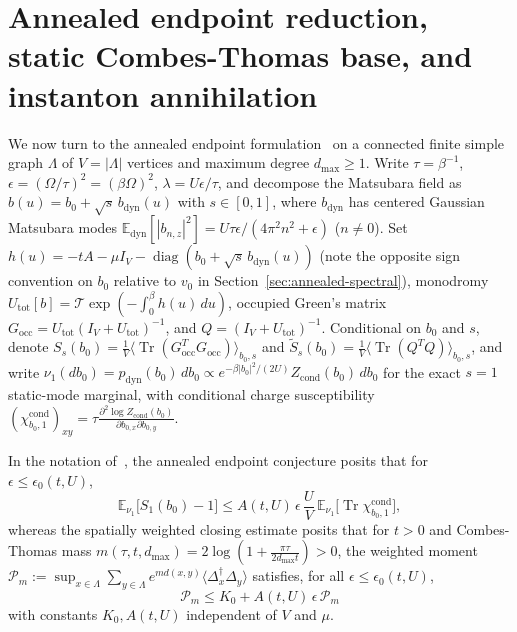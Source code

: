 \documentclass[11pt]{article}
\theoremstyle{definition}
\theoremstyle{remark}
\DeclareMathOperator{\Tr}{Tr}
\DeclareMathOperator{\diag}{diag}
\newcommand{\E}{\mathbb{E}}
\begin{document}
\section{Annealed endpoint reduction, static Combes-Thomas base, and instanton annihilation}
\label{sec:annealed-endpoint}

We now turn to the annealed endpoint formulation~\cite{fisher,capstone} on a
connected finite simple graph $\Lambda$ of $V = |\Lambda|$ vertices and
maximum degree $d_{\max} \ge 1$. Write $\tau = \beta^{-1}$,
$\epsilon = (\Omega/\tau)^2 = (\beta\Omega)^2$, $\lambda = U\epsilon/\tau$,
and decompose the Matsubara field as $b(u) = b_0 + \sqrt{s}\, b_{\mathrm{dyn}}(u)$
with $s \in [0,1]$, where $b_{\mathrm{dyn}}$ has centered Gaussian Matsubara
modes $\E_{\mathrm{dyn}}[|b_{n,z}|^2] = U\tau \epsilon/(4\pi^2 n^2 + \epsilon)$
($n \ne 0$). Set $h(u) = -tA - \mu I_V - \diag(b_0 + \sqrt{s}\,b_{\mathrm{dyn}}(u))$
(note the opposite sign convention on $b_0$ relative to $v_0$ in
Section~\ref{sec:annealed-spectral}), monodromy
$U_{\mathrm{tot}}[b] = \mathcal{T}\exp(-\int_0^\beta h(u)\,du)$,
occupied Green's matrix $G_{\mathrm{occ}} = U_{\mathrm{tot}}(I_V + U_{\mathrm{tot}})^{-1}$,
and $Q = (I_V + U_{\mathrm{tot}})^{-1}$. Conditional on $b_0$ and $s$, denote
$S_s(b_0) = \frac{1}{V}\langle \Tr(G_{\mathrm{occ}}^T G_{\mathrm{occ}}) \rangle_{b_0,s}$
and $\tilde{S}_s(b_0) = \frac{1}{V}\langle \Tr(Q^T Q) \rangle_{b_0,s}$, and
write $\nu_1(db_0) = p_{\mathrm{dyn}}(b_0)\,db_0 \propto e^{-\beta |b_0|^2/(2U)} Z_{\mathrm{cond}}(b_0)\,db_0$
for the exact $s=1$ static-mode marginal, with conditional charge susceptibility
$(\chi_{b_0,1}^{\mathrm{cond}})_{xy} = \tau\frac{\partial^2 \log Z_{\mathrm{cond}}(b_0)}{\partial b_{0,x}\partial b_{0,y}}$.

In the notation of~\cite{fisher,capstone}, the annealed endpoint conjecture
posits that for $\epsilon \le \epsilon_0(t,U)$,
\begin{equation}
\label{eq:ae-conj1}
\E_{\nu_1}\bigl[S_1(b_0) - 1\bigr]
\le A(t,U)\,\epsilon\,\frac{U}{V}\,\E_{\nu_1}\bigl[\Tr \chi_{b_0,1}^{\mathrm{cond}}\bigr],
\end{equation}
whereas the spatially weighted closing estimate posits that for $t > 0$ and
Combes-Thomas mass $m(\tau, t, d_{\max}) = 2\log(1 + \frac{\pi\tau}{2 d_{\max} t}) > 0$,
the weighted moment $\mathcal{P}_m := \sup_{x\in\Lambda}\sum_{y\in\Lambda} e^{m d(x,y)} \langle \Delta_x^\dagger \Delta_y\rangle$
satisfies, for all $\epsilon \le \epsilon_0(t,U)$,
\begin{equation}
\label{eq:ae-closing2}
\mathcal{P}_m \le K_0 + A(t,U)\,\epsilon\,\mathcal{P}_m
\end{equation}
with constants $K_0, A(t,U)$ independent of $V$ and $\mu$.
\end{document}
